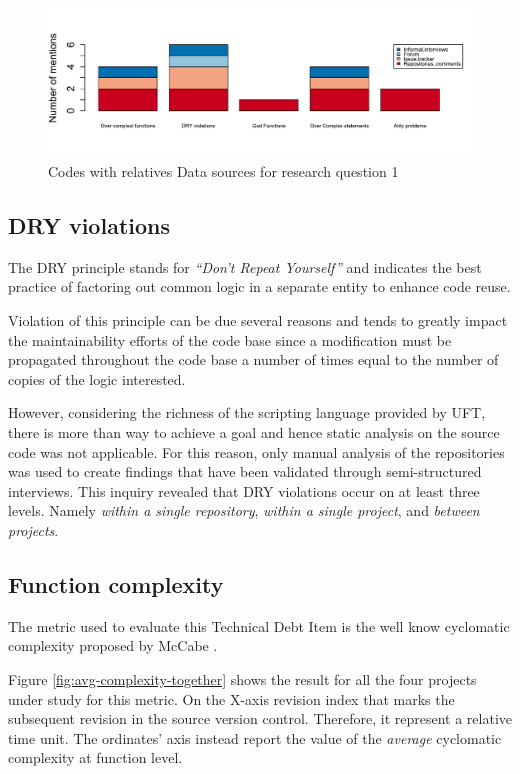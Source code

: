 \begin{figure}[!htbp]
    \centering
    \includegraphics[width=\textwidth,keepaspectratio]{figure/results/rq1/sources.pdf}
    \caption{Codes with relatives Data sources for research question 1}
    \label{fig:rq1_sources}
\end{figure}



\subsection{DRY violations}
    The DRY principle stands for \textit{``Don't Repeat Yourself''} and indicates the best practice of factoring out common logic in a separate entity to enhance code reuse.
    
    Violation of this principle can be due several reasons and tends to greatly impact the maintainability efforts of the code base since a modification must be propagated throughout the code base a number of times equal to the number of copies of the logic interested.
    
    However, considering the richness of the scripting language provided by UFT, there is more than way to achieve a goal and hence static analysis on the source code was not applicable. For this reason, only manual analysis of the repositories was used to create findings that have been validated through semi-structured interviews. This inquiry revealed that DRY violations occur on at least three levels. Namely \textit{within a single repository}, \textit{within a single project}, and \textit{between projects}.


\subsection{Function complexity}
    The metric used to evaluate this Technical Debt Item is the well know cyclomatic complexity proposed by McCabe \cite{cyclomatic_complexity}.

    Figure \ref{fig:avg-complexity-together} shows the result for all the four projects under study for this metric. On the X-axis revision index that marks the subsequent revision in the source version control. Therefore, it represent a relative time unit. The ordinates' axis instead report the value of the \textit{average} cyclomatic complexity at function level.
    
